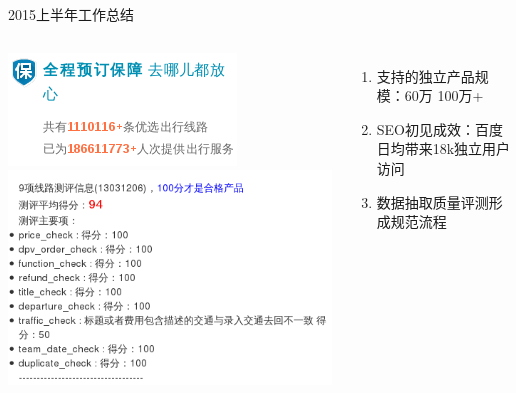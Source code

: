 \documentclass{beamer}
\begin{document}
\begin{CJK}{UTF8}{gbsn}
\begin{frame}{2015上半年工作总结}
  \begin{columns}
    \begin{center}
       {\includegraphics[scale=0.5]{./images/product-scale}}
       {\includegraphics[scale=0.3]{./images/route-quality}}
    \end{center}
    \begin{enumerate}[1]
      \item<2> 支持的独立产品规模：60万  100万+
      \item<3> SEO初见成效：百度日均带来18k独立用户访问
      \item<4> 数据抽取质量评测形成规范流程
    \end{enumerate}
  \end{columns}
\end{frame}


\end{CJK}
\end{document}

